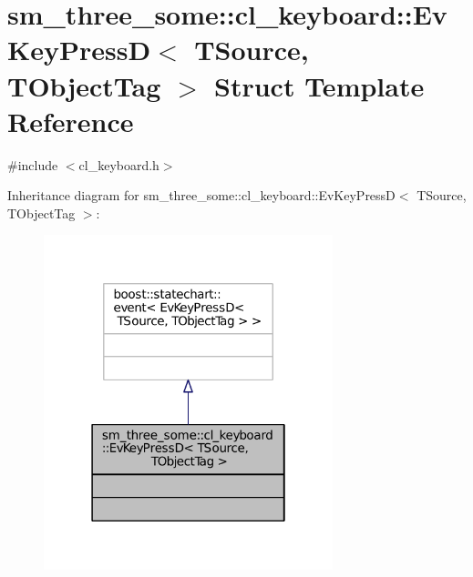 \hypertarget{structsm__three__some_1_1cl__keyboard_1_1EvKeyPressD}{}\section{sm\+\_\+three\+\_\+some\+:\+:cl\+\_\+keyboard\+:\+:Ev\+Key\+PressD$<$ T\+Source, T\+Object\+Tag $>$ Struct Template Reference}
\label{structsm__three__some_1_1cl__keyboard_1_1EvKeyPressD}


{\ttfamily \#include $<$cl\+\_\+keyboard.\+h$>$}



Inheritance diagram for sm\+\_\+three\+\_\+some\+:\+:cl\+\_\+keyboard\+:\+:Ev\+Key\+PressD$<$ T\+Source, T\+Object\+Tag $>$\+:
\nopagebreak
\begin{figure}[H]
\begin{center}
\leavevmode
\includegraphics[width=238pt]{structsm__three__some_1_1cl__keyboard_1_1EvKeyPressD__inherit__graph}
\end{center}
\end{figure}


